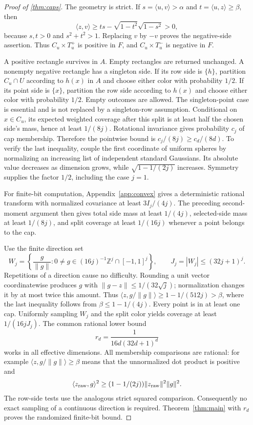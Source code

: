 \begin{proof}[Proof of \cref{thm:caps}]
The geometry is strict. If $s=\langle u,v\rangle>\alpha$ and $t=\langle u,z\rangle\ge\beta$, then
\[
 \langle z,v\rangle\ge ts-\sqrt{1-t^2}\sqrt{1-s^2}>0,
\]
because $s,t>0$ and $s^2+t^2>1$. Replacing $v$ by $-v$ proves the negative-side assertion. Thus $C_u\times T_u^+$ is positive in $F$, and $C_u\times T_u^-$ is negative in $F$.

A positive rectangle survives in $A$. Empty rectangles are returned unchanged. A nonempty negative rectangle has a singleton side. If its row side is $\{h\}$, partition $C_u\cap U$ according to $h(x)$ in $A$ and choose either color with probability $1/2$. If its point side is $\{x\}$, partition the row side according to $h(x)$ and choose either color with probability $1/2$. Empty outcomes are allowed. The singleton-point case is essential and is not replaced by a singleton-row assumption. Conditional on $x\in C_u$, its expected weighted coverage after this split is at least half the chosen side's mass, hence at least $1/(8j)$. Rotational invariance gives probability $c_j$ of cap membership. Therefore the pointwise bound is $c_j/(8j)\ge c_d/(8d)$. To verify the last inequality, couple the first coordinate of uniform spheres by normalizing an increasing list of independent standard Gaussians. Its absolute value decreases as dimension grows, while $\sqrt{1-1/(2j)}$ increases. Symmetry supplies the factor $1/2$, including the case $j=1$.

For finite-bit computation, Appendix~\ref{app:convex} gives a deterministic rational transform with normalized covariance at least $3I_j/(4j)$. The preceding second-moment argument then gives total side mass at least $1/(4j)$, selected-side mass at least $1/(8j)$, and split coverage at least $1/(16j)$ whenever a point belongs to the cap.

Use the finite direction set
\[
 W_j=\left\{\frac{g}{\|g\|}:0\ne g\in(16j)^{-1}\mathbb Z^j\cap[-1,1]^j\right\},
 \qquad J_j=|W_j|\le(32j+1)^j.
\]
Repetitions of a direction cause no difficulty. Rounding a unit vector coordinatewise produces $g$ with $\|g-z\|\le1/(32\sqrt j)$; normalization changes it by at most twice this amount. Thus $\langle z,g/\|g\|\rangle\ge1-1/(512j)>\beta$, where the last inequality follows from $\beta\le1-1/(4j)$. Every point is in at least one cap. Uniformly sampling $W_j$ and the split color yields coverage at least $1/(16jJ_j)$. The common rational lower bound
\begin{equation}\label{eq:netr}
 r_d=\frac1{16d(32d+1)^d}
\end{equation}
works in all effective dimensions. All membership comparisons are rational: for example $\langle z,g/\|g\|\rangle\ge\beta$ means that the unnormalized dot product is positive and
\[
 \langle z_{\rm raw},g\rangle^2\ge(1-1/(2j))\|z_{\rm raw}\|^2\|g\|^2.
\] The row-side tests use the analogous strict squared comparison. Consequently no exact sampling of a continuous direction is required. Theorem~\ref{thm:main} with $r_d$ proves the randomized finite-bit bound.


\end{proof}
